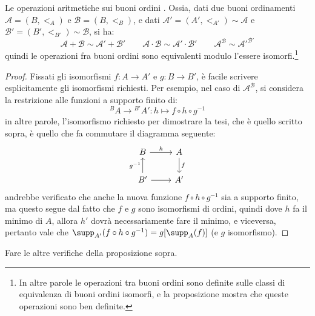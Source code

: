 \documentclass[11pt]{scrartcl}
\begin{document}
\begin{proposition}
	Le operazioni aritmetiche sui buoni ordini . Ossia, dati due buoni ordinamenti $\mathcal A = (B,<_A)$
	e $\mathcal B = (B,<_B)$, e dati $\mathcal A' = (A',<_{A'}) \sim \mathcal A$ e $\mathcal{B}' = (B',<_{B'}) \sim \mathcal B$, si ha:
	\[ \mathcal{A} + \mathcal{B} \sim \mathcal{A}' + \mathcal{B'} \qquad \mathcal{A} \cdot \mathcal{B} \sim \mathcal{A}' \cdot \mathcal{B'} \qquad \mathcal{A}^{\mathcal{B}} \sim \mathcal{A}'^{\mathcal{B'}}
		\]
	quindi le operazioni fra buoni ordini sono equivalenti modulo l'essere isomorfi.\footnote{In altre parole le operazioni tra buoni ordini sono definite sulle classi di equivalenza di buoni ordini isomorfi, e la proposizione mostra che queste 
	operazioni sono ben definite.}
\end{proposition}

\begin{proof}
	Fissati gli isomorfismi $f : A \rightarrow A'$ e $g : B \rightarrow B'$, è facile scrivere esplicitamente gli isomorfismi richiesti. Per esempio, nel caso di $\mathcal{A}^{\mathcal{B}}$, si considera la restrizione alle funzioni a supporto finito di:
	\[ {}^{B}A \rightarrow {}^{B'}A' : h \mapsto f \circ h \circ g^{-1}
		\]
	in altre parole, l'isomorfismo richiesto per dimostrare la tesi, che è quello scritto sopra, è quello che fa commutare il diagramma seguente:
	\[\begin{tikzcd}
		B & A \\
		{B'} & {A'}
		\arrow["h", from=1-1, to=1-2]
		\arrow["{g^{-1}}", from=2-1, to=1-1]
		\arrow[from=2-1, to=2-2]
		\arrow["f", from=1-2, to=2-2]
	\end{tikzcd}\]
	andrebbe verificato che anche la nuova funzione $f \circ h \circ g^{-1}$ sia a supporto finito, ma questo segue dal fatto che $f$ e $g$ sono isomorfismi di ordini, quindi dove $h$ fa il minimo di $A$,
	allora $h'$ dovrà necessariamente fare il minimo, e viceversa, pertanto vale che $\supp_{A'}(f \circ h \circ g^{-1}) = g[\supp_A(f)]$ (e $g$ isomorfismo).
\end{proof}

\begin{exercise}
	Fare le altre verifiche della proposizione sopra.
\end{exercise}
\end{document}
